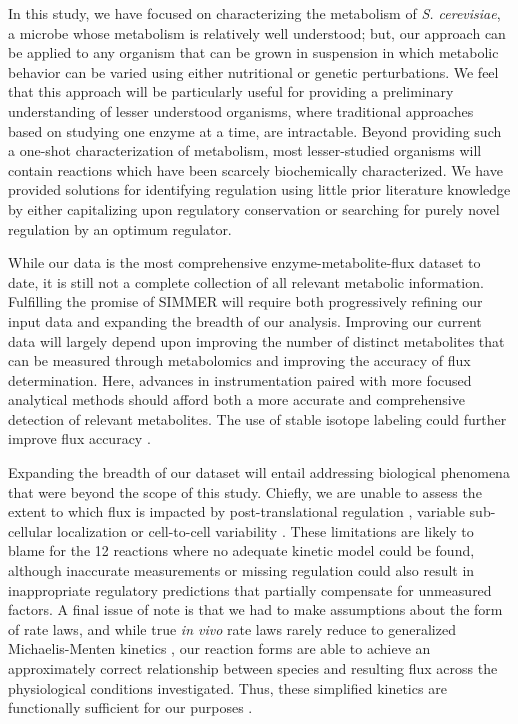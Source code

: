 In this study, we have focused on characterizing the metabolism of \textit{S. cerevisiae}, a microbe whose metabolism is relatively well understood; but, our approach can be applied to any organism that can be grown in suspension in which metabolic behavior can be varied using either nutritional or genetic perturbations.  We feel that this approach will be particularly useful for providing a preliminary understanding of lesser understood organisms, where traditional approaches based on studying one enzyme at a time, are intractable.  Beyond providing such a one-shot characterization of metabolism, most lesser-studied organisms will contain reactions which have been scarcely biochemically characterized.  We have provided solutions for identifying regulation using little prior literature knowledge by either capitalizing upon regulatory conservation or searching for purely novel regulation by an optimum regulator.

While our data is the most comprehensive enzyme-metabolite-flux dataset to date, it is still not a complete collection of all relevant metabolic information.  Fulfilling the promise of SIMMER will require both progressively refining our input data and expanding the breadth of our analysis.  Improving our current data will largely depend upon improving the number of distinct metabolites that can be measured through metabolomics and improving the accuracy of flux determination.  Here, advances in instrumentation paired with more focused analytical methods should afford both a more accurate and comprehensive detection of relevant metabolites. The use of stable isotope labeling could further improve flux accuracy \cite{Yuan:2008er}.

Expanding the breadth of our dataset will entail addressing biological phenomena that were beyond the scope of this study.  Chiefly, we are unable to assess the extent to which flux is impacted by post-translational regulation \cite{Fiedler:2009hx, Schulz:2014eo}, variable sub-cellular localization \cite{Kitamoto:1988wc} or cell-to-cell variability \cite{Tu:2005cv}.  These limitations are likely to blame for the 12 reactions where no adequate kinetic model could be found, although inaccurate measurements or missing regulation could also result in inappropriate regulatory predictions that partially compensate for unmeasured factors.  A final issue of note is that we had to make assumptions about the form of rate laws, and while true \textit{in vivo} rate laws rarely reduce to generalized Michaelis-Menten kinetics \cite{Hill:1977vm}, our reaction forms are able to achieve an approximately correct relationship between species and resulting flux across the physiological conditions investigated. Thus, these simplified kinetics are functionally sufficient for our purposes \cite{Fell:1997wg}.

